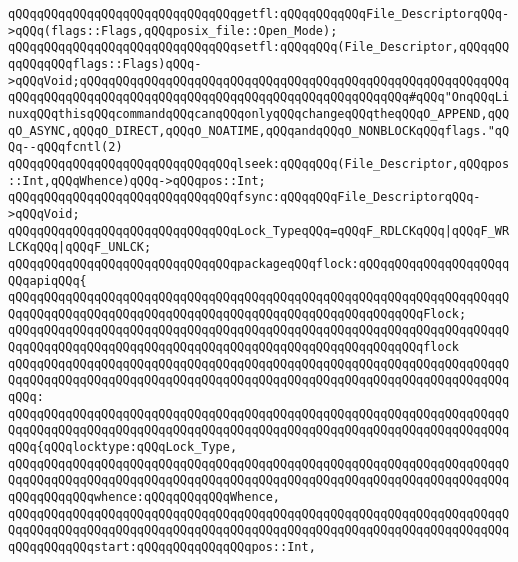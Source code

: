 \verb|qQQqqQQqqQQqqQQqqQQqqQQqqQQqqQQqgetfl:qQQqqQQqqQQqFile_DescriptorqQQq->qQQq(flags::Flags,qQQqposix_file::Open_Mode);|\newline
\verb|qQQqqQQqqQQqqQQqqQQqqQQqqQQqqQQqsetfl:qQQqqQQq(File_Descriptor,qQQqqQQqqQQqqQQqflags::Flags)qQQq->qQQqVoid;qQQqqQQqqQQqqQQqqQQqqQQqqQQqqQQqqQQqqQQqqQQqqQQqqQQqqQQqqQQqqQQqqQQqqQQqqQQqqQQqqQQqqQQqqQQqqQQqqQQqqQQqqQQqqQQqqQQq#qQQq"OnqQQqLinuxqQQqthisqQQqcommandqQQqcanqQQqonlyqQQqchangeqQQqtheqQQqO_APPEND,qQQqO_ASYNC,qQQqO_DIRECT,qQQqO_NOATIME,qQQqandqQQqO_NONBLOCKqQQqflags."qQQq--qQQqfcntl(2)|\newline
\newline
\newline
\verb|qQQqqQQqqQQqqQQqqQQqqQQqqQQqqQQqlseek:qQQqqQQq(File_Descriptor,qQQqpos::Int,qQQqWhence)qQQq->qQQqpos::Int;|\newline
\newline
\verb|qQQqqQQqqQQqqQQqqQQqqQQqqQQqqQQqfsync:qQQqqQQqFile_DescriptorqQQq->qQQqVoid;|\newline
\newline
\verb|qQQqqQQqqQQqqQQqqQQqqQQqqQQqqQQqLock_TypeqQQq=qQQqF_RDLCKqQQq|\verb#|qQQqF_WRLCKqQQq|qQQqF_UNLCK;#\newline
\newline
\verb|qQQqqQQqqQQqqQQqqQQqqQQqqQQqqQQqpackageqQQqflock:qQQqqQQqqQQqqQQqqQQqqQQqapiqQQq{|\newline
\verb|qQQqqQQqqQQqqQQqqQQqqQQqqQQqqQQqqQQqqQQqqQQqqQQqqQQqqQQqqQQqqQQqqQQqqQQqqQQqqQQqqQQqqQQqqQQqqQQqqQQqqQQqqQQqqQQqqQQqqQQqqQQqqQQqFlock;|\newline
\newline
\verb|qQQqqQQqqQQqqQQqqQQqqQQqqQQqqQQqqQQqqQQqqQQqqQQqqQQqqQQqqQQqqQQqqQQqqQQqqQQqqQQqqQQqqQQqqQQqqQQqqQQqqQQqqQQqqQQqqQQqqQQqqQQqqQQqflock|\newline
\verb|qQQqqQQqqQQqqQQqqQQqqQQqqQQqqQQqqQQqqQQqqQQqqQQqqQQqqQQqqQQqqQQqqQQqqQQqqQQqqQQqqQQqqQQqqQQqqQQqqQQqqQQqqQQqqQQqqQQqqQQqqQQqqQQqqQQqqQQqqQQqqQQq:|\newline
\verb|qQQqqQQqqQQqqQQqqQQqqQQqqQQqqQQqqQQqqQQqqQQqqQQqqQQqqQQqqQQqqQQqqQQqqQQqqQQqqQQqqQQqqQQqqQQqqQQqqQQqqQQqqQQqqQQqqQQqqQQqqQQqqQQqqQQqqQQqqQQqqQQq{qQQqlocktype:qQQqLock_Type,|\newline
\verb|qQQqqQQqqQQqqQQqqQQqqQQqqQQqqQQqqQQqqQQqqQQqqQQqqQQqqQQqqQQqqQQqqQQqqQQqqQQqqQQqqQQqqQQqqQQqqQQqqQQqqQQqqQQqqQQqqQQqqQQqqQQqqQQqqQQqqQQqqQQqqQQqqQQqqQQqwhence:qQQqqQQqqQQqWhence,|\newline
\verb|qQQqqQQqqQQqqQQqqQQqqQQqqQQqqQQqqQQqqQQqqQQqqQQqqQQqqQQqqQQqqQQqqQQqqQQqqQQqqQQqqQQqqQQqqQQqqQQqqQQqqQQqqQQqqQQqqQQqqQQqqQQqqQQqqQQqqQQqqQQqqQQqqQQqqQQqstart:qQQqqQQqqQQqqQQqpos::Int,|\newline
